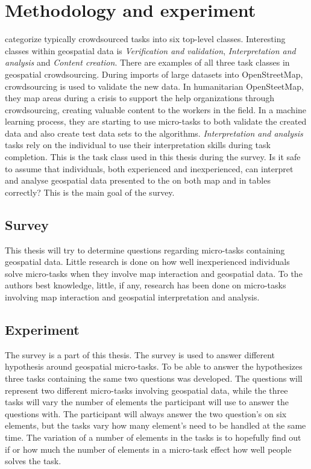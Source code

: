 \chapter{Methodology and experiment}

\cite{Gadiraju2015} categorize typically crowdsourced tasks into six top-level classes. Interesting classes within geospatial data is \textit{Verification and validation}, \textit{Interpretation and analysis} and \textit{Content creation}. There are examples of all three task classes in geospatial crowdsourcing. During imports of large datasets into OpenStreetMap, crowdsourcing is used to validate the new data. In humanitarian OpenSteetMap, they map areas during a crisis to support the help organizations through crowdsourcing, creating valuable content to the workers in the field. In a machine learning process, they are starting to use micro-tasks to both validate the created data and also create test data sets to the algorithms. \textit{Interpretation and analysis} tasks rely on the individual to use their interpretation skills during task completion. This is the task class used in this thesis during the survey. Is it safe to assume that individuals, both experienced and inexperienced, can interpret and analyse geospatial data presented to the on both map and in tables correctly? This is the main goal of the survey. 

\section{Survey}
This thesis will try to determine questions regarding micro-tasks containing geospatial data. Little research is done on how well inexperienced individuals solve micro-tasks when they involve map interaction and geospatial data. To the authors best knowledge, little, if any, research has been done on micro-tasks involving map interaction and geospatial interpretation and analysis. 

\section{Experiment}\label{sec:survey}
The survey is a part of this thesis. The survey is used to answer different hypothesis around geospatial micro-tasks. To be able to answer the hypothesizes three tasks containing the same two questions was developed. The questions will represent two different micro-tasks involving geospatial data, while the three tasks will vary the number of elements the participant will use to answer the questions with. The participant will always answer the two question's on six elements, but the tasks vary how many element's need to be handled at the same time. The variation of a number of elements in the tasks is to hopefully find out if or how much the number of elements in a micro-task effect how well people solves the task. 

